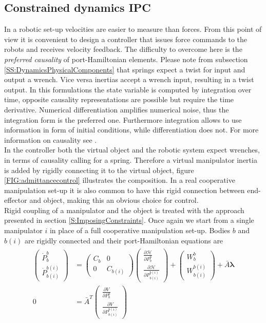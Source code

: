 \documentclass[a4paper,twoside, openright,12pt]{report}
\begin{document}
\subsection{Constrained dynamics IPC}\label{SS:constrainedDIPC}
In a robotic set-up velocities are easier to measure than forces. From this point of view it is convenient to design a controller that issues force commands to the robots and receives velocity feedback. The difficulty to overcome here is the \emph{preferred causality} of port-Hamiltonian elements. Please note from subsection \ref{SS:DynamicsPhysicalComponents} that springs expect a twist for input and output a wrench. Vice versa inertias accept a wrench input, resulting in a twist output. In this formulations the state variable is computed by integration over time, opposite causality representations are possible but require the time derivative. Numerical differentiation amplifies numerical noise, thus the integration form is the preferred one. Furthermore integration allows to use information in form of initial conditions, while differentiation does not. For more information on causality see \cite{duindam2009geoplexbook}.\\
 In the controller both the virtual object and the robotic system expect wrenches, in terms of causality calling for a spring. Therefore a virtual manipulator inertia is added by rigidly connecting it to the virtual object, figure \ref{FIG:admittancecontrol} illustrates the composition. In a real cooperative manipulation set-up it is also  common to  have this rigid connection between end-effector and object, making this an obvious choice for control. \\
Rigid coupling of a manipulator and the object is treated with the approach presented in section \ref{S:ImposingConstraints}. Once again we start from a single manipulator $i$ in place of a full cooperative manipulation set-up. Bodies $b$ and $b(i)$ are rigidly connected and their port-Hamiltonian equations are
\begin{eqnarray}
\begin{aligned}
\begin{pmatrix}
\dot{P}_b^b \\ \dot{P}_{b(i)}^{b(i)}
\end{pmatrix}
&=
\begin{pmatrix}
C_b & 0 \\ 0 & C_{b(i)} 
\end{pmatrix}
\begin{pmatrix} \frac{\partial \mathcal{H}}{\partial P_b^b} \\ 
\frac{\partial \mathcal{H}}{\partial P_{b(i)}^{b(i)}}
\end{pmatrix}
+
\begin{pmatrix}
W_b^b \\ W_{b(i)}^{b(i)}
\end{pmatrix}
+
\bar{A}\boldsymbol{\lambda} 
\\
0 
&=
\bar{A}^T 
\begin{pmatrix} \frac{\partial V}{\partial P_b^b} \\ 
\frac{\partial V}{\partial P_{b(i)}^{b(i)}}
\end{pmatrix}
\end{aligned}
\end{eqnarray}
\end{document}
